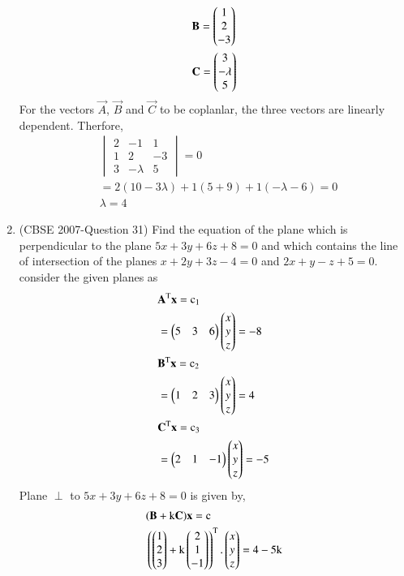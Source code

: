 \documentclass[journal,12pt,twocolumn]{IEEEtran}
\begin{document}
\begin{enumerate}
\begin{align}
&\mathbf{B}=\begin{pmatrix}1\\2\\-3\end{pmatrix}\\
&\mathbf{C}=\begin{pmatrix}3\\-\lambda\\5\end{pmatrix}
\end{align}
For the vectors $\vec{A}$, $\vec{B}$ and $\vec{C}$ to be coplanlar, the three vectors are linearly dependent. Therfore,
\begin{align}
  &\begin{vmatrix}
    2 & -1& 1\\ 1& 2& -3\\3&-\lambda&5 
    \end{vmatrix} = 0 \\
& = 2(10-3\lambda)+1(5+9)+1(-\lambda -6)=0\\
& \lambda=4
\end{align}
\item (CBSE 2007-Question 31) Find the equation of the plane which is perpendicular to the plane $5x + 3y + 6 z + 8 = 0$ and which contains the line of intersection of the planes $x + 2y + 3z - 4 = 0 $ and $2x + y - z + 5 = 0$.\\ 
\solution consider the given planes as
\begin{align}
&\mathbf{A}^\text T\mathbf{x}=\text c_1\nonumber \\&=\begin{pmatrix}5&3&6\end{pmatrix}\begin{pmatrix}x\\y\\z\end{pmatrix}=-8 \label{eq:0.0.46}\\ 
&\mathbf{B}^\text T\mathbf{x}=\text c_2\nonumber \\&=\begin{pmatrix}1&2&3\end{pmatrix}\begin{pmatrix}x\\y\\z\end{pmatrix}=4\\
  &\mathbf{C}^\text T\mathbf{x}=\text c_3\nonumber \\&=\begin{pmatrix}2&1&-1\end{pmatrix}\begin{pmatrix}x\\y\\z\end{pmatrix}=-5
\end{align}
Plane $\perp$ to $5x + 3y + 6 z + 8 = 0$ is given by,
\begin{align}
&(\vec{B}+\text k\vec{C})\vec{x}= \text c\\
&\left(\myvec{1\\2\\3}+\text k\myvec{2\\1\\-1}\right)^\text T.\myvec{x\\y\\z} =4-5\text k \label{eq:0.0.50} 

\end{align}
\end{enumerate}
\end{document}
